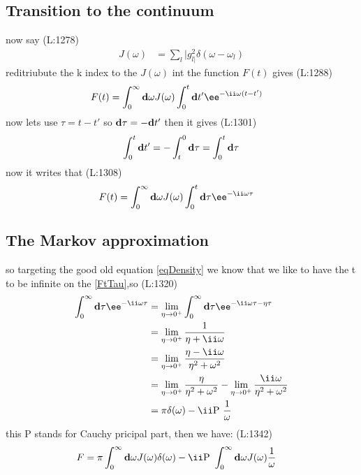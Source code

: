 \subsection{Transition to the continuum}
 now say 
(L:1278)
\begin{equation}
\begin{split}
J (\omega )&=\sum _{l }|g _{l |}^{2}\delta (\omega -\omega _{l })\end{split}
\end{equation}
 reditriubute the k index to the 
 $ J (\omega ) $  int the function 
 $ F (t ) $  gives  
(L:1288)
\begin{equation}
\begin{split}
F (t )&=\int _{0}^{\infty }\bold{d}\omega J (\omega )\int _{0}^{t }\bold{d}t '\ee ^{-\ii \omega (t -t ')}\end{split}
\end{equation}
 now lets use 
 $ \tau =t -t ' $  so 
 $ \bold{d}\tau =-\bold{d}t ' $  then it gives 
(L:1301)
\begin{equation}
\begin{split}
\int _{0}^{t }\bold{d}t '=-\int _{t }^{0}\bold{d}\tau =\int _{0}^{t }\bold{d}\tau \end{split}
\end{equation}
 now it writes that  
(L:1308)
\begin{equation}
\begin{split}
\label{FtTau}F (t )&=\int _{0}^{\infty }\bold{d}\omega J (\omega )\int _{0}^{t }\bold{d}\tau \ee ^{-\ii \omega \tau }\end{split}
\end{equation}
\subsection{The Markov approximation}
 so targeting the good old equation \eqref{eqDensity}
 we know that we like to have the t to be infinite on the \eqref{FtTau},so
(L:1320)
\begin{equation}
\begin{split}
\int _{0}^{\infty }\bold{d}\tau \ee ^{-\ii \omega \tau }&=\lim _{\eta \rightarrow 0^{+}}\int _{0}^{\infty }\bold{d}\tau \ee ^{-\ii \omega \tau -\eta \tau }\\
&=\lim _{\eta \rightarrow 0^{+}}\frac{1}{\eta +\ii \omega }\\
&=\lim _{\eta \rightarrow 0^{+}}\frac{\eta -\ii \omega }{\eta ^{2}+\omega ^{2}}\\
&=\lim _{\eta \rightarrow 0^{+}}\frac{\eta }{\eta ^{2}+\omega ^{2}}-\lim _{\eta \rightarrow 0^{+}}\frac{\ii \omega }{\eta ^{2}+\omega ^{2}}\\
&=\pi \delta (\omega )-\ii \text{P }\frac{1}{\omega }\end{split}
\end{equation}
 this P stands for Cauchy pricipal part, then we have:
(L:1342)
\begin{equation}
\begin{split}
F &=\pi \int _{0}^{\infty }\bold{d}\omega J (\omega )\delta (\omega )-\ii \text{P }\int _{0}^{\infty }\bold{d}\omega J (\omega )\frac{1}{\omega }\end{split}
\end{equation}
